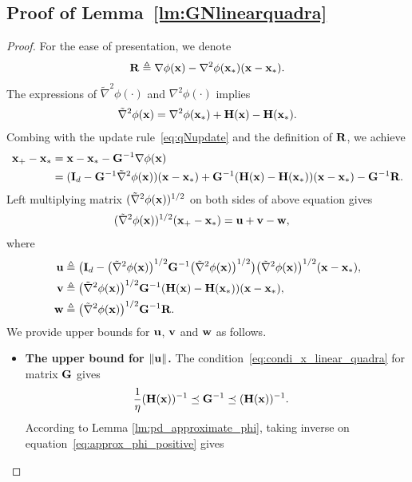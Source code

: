 \documentclass[11pt]{article}
\theoremstyle{plain}
\theoremstyle{definition}
\theoremstyle{remark}
\theoremstyle{plain}
\def\vv{{\bf{v}}}
\def\vw{{\bf{w}}}
\def\mR {{\bf R}}
\newcommand{\R}{\mathbb{R}}
\def\vw {{{\bf w}}}
\def\G{{\bf G}}
\def\H{{\bf H}}
\def\I{{\bf I}}
\def\R{{\bf R}}
\def\u{{\bf u}}
\def\v{{\bf v}}
\def\w{{\bf w}}
\def\x{{\bf x}}
\begin{document}
\subsection{Proof of Lemma~\ref{lm:GNlinearquadra}}
\label{app:proof_lemma_linear_quadratic_over}
\begin{proof}
For the ease of presentation, we denote
\begin{align}\label{eq:dfn-R}
\R\triangleq\nabla\phi(\x)-\nabla^2\phi(\x_*)(\x-\x_*).    
\end{align}
The expressions of $\tilde{\nabla}^2\phi(\cdot)$ and ${\nabla}^2\phi(\cdot)$ implies
\begin{align*}
\tilde{\nabla}^2\phi(\x)=\nabla^2\phi(\x_*)+\H(\x)-\H(\x_*).  
\end{align*}
Combing with the update rule~\eqref{eq:qNupdate} and the definition of $\mR$, we achieve
\begin{align*}
\x_{+}-\x_*
&=\x-\x_*-\G^{-1}\nabla\phi(\x)\\
&=(\I_d-\G^{-1}\tilde{\nabla}^2\phi(\x))(\x-\x_*)
  +\G^{-1}(\H(\x)-\H(\x_*))(\x-\x_*)-\G^{-1}\R.
\end{align*}
Left multiplying matrix $(\tilde{\nabla}^2\phi(\x))^{1/2}$ on both sides of above equation gives
\begin{align}
\label{eq:splithatlambda}
(\tilde{\nabla}^2\phi(\x))^{1/2}(\x_{+}-\x_*)
&=\u+\v-\w,
\end{align}
where
\begin{align}
\u
&\triangleq\bigl(\I_d-\bigl(\tilde{\nabla}^2\phi(\x)\bigr)^{1/2}
\G^{-1}\bigl(\tilde{\nabla}^2\phi(\x)\bigr)^{1/2}\bigr)
\bigl(\tilde{\nabla}^2\phi(\x)\bigr)^{1/2}(\x-\x_*), \label{dfn:proof-u}\\
\v
&\triangleq\bigl(\tilde{\nabla}^2\phi(\x)\bigr)^{1/2}\G^{-1}
(\H(\x)-\H(\x_*))(\x-\x_*), \label{dfn:proof-v}\\
\w
&\triangleq\bigl(\tilde{\nabla}^2\phi(\x)\bigr)^{1/2}\G^{-1}\R. \label{dfn:proof-w}
\end{align}
We provide upper bounds for $\u$, $\vv$ and $\vw$ as follows.
\begin{itemize}
\item \textbf{The upper bound for $\|\u\|$.}
The condition~\eqref{eq:condi_x_linear_quadra} for matrix $\G$ gives
\begin{align*}
\frac{1}{\eta}(\H(\x))^{-1}
&\preceq\G^{-1}\preceq(\H(\x))^{-1}.
\end{align*}
According to Lemma \ref{lm:pd_approximate_phi},
taking inverse on equation~\eqref{eq:approx_phi_positive} gives

\end{itemize}
\end{proof}
\end{document}
